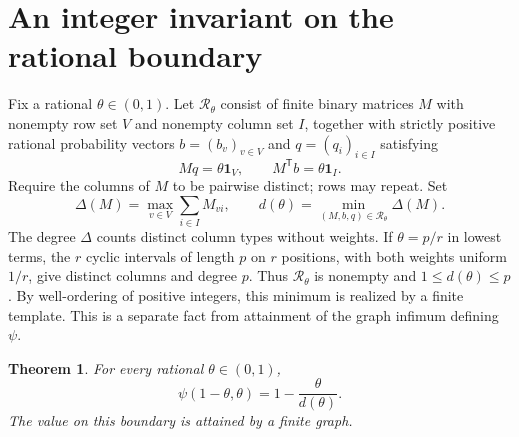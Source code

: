 \documentclass[11pt]{article}
\newtheorem{theorem}{Theorem}
\begin{document}
\section{An integer invariant on the rational boundary}
Fix a rational $\theta\in(0,1)$. Let $\mathcal R_\theta$ consist of
finite binary matrices $M$ with nonempty row set $V$ and nonempty
column set $I$, together with strictly positive rational probability
vectors $b=(b_v)_{v\in V}$ and $q=(q_i)_{i\in I}$ satisfying
\begin{equation}\label{regular}
 Mq=\theta\mathbf1_V,\qquad M^{\mathsf T}b=\theta\mathbf1_I.
\end{equation}
Require the columns of $M$ to be pairwise distinct; rows may repeat.
Set
\[
 \Delta(M)=\max_{v\in V}\sum_{i\in I}M_{vi},\qquad
 d(\theta)=\min_{(M,b,q)\in\mathcal R_\theta}\Delta(M).
\]
The degree $\Delta$ counts distinct column types without weights.
If $\theta=p/r$ in lowest terms, the $r$ cyclic intervals of length
$p$ on $r$ positions, with both weights uniform $1/r$, give distinct
columns and degree $p$. Thus $\mathcal R_\theta$ is nonempty and
$1\leq d(\theta)\leq p$. By well-ordering of positive integers,
this minimum is realized by a finite template. This is a separate
fact from attainment of the graph infimum defining $\psi$.

\begin{theorem}\label{boundary}
For every rational $\theta\in(0,1)$,
\begin{equation}\label{formula}
 \psi(1-\theta,\theta)=1-\frac{\theta}{d(\theta)}.
\end{equation}
The value on this boundary is attained by a finite graph.
\end{theorem}
\end{document}
